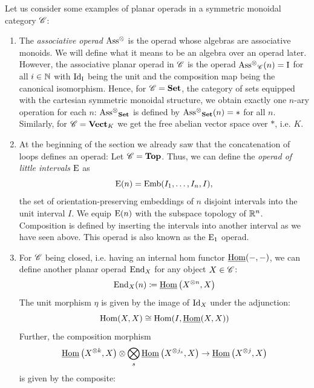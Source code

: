     \begin{egs}\label{egs_planar_operad} Let us consider some examples of planar
        operads in a symmetric monoidal category $\mathscr{C}$:
        \begin{enumerate} 
            \item The \textit{associative operad} $\operatorname{Ass^{\otimes}}$ is the operad whose
            algebras are associative monoids. We will define what it means to be
            an algebra over an operad later. However, the associative planar
            operad in $\mathscr{C}$ is the operad $\operatorname{Ass^{\otimes}}_{\mathscr{C}}(n) = \operatorname{I}$ for all $i \in \mathbb{N}$
            with $\operatorname{Id}_{\operatorname{I}}$ being the unit and the composition map being the
            canonical isomorphism. Hence, for $\mathscr{C}=\operatorname{\textbf{Set}}$, the category of sets
            equipped with the cartesian symmetric monoidal structure, we obtain
            exactly one $n$-ary operation for each $n$: $\operatorname{Ass^{\otimes}}_{\operatorname{\textbf{Set}}}$ is defined
            by $\operatorname{Ass^{\otimes}}_{\operatorname{\textbf{Set}}}(n) = \ast$ for all $n$. Similarly, for $\mathscr{C} =
            \operatorname{\textbf{Vect}}_K$ we get the free abelian vector space over $\ast$, i.e. $K$.
            
        
            \item At the beginning of the section we already saw that the
            concatenation of loops defines an operad: Let $\mathscr{C} = \operatorname{\textbf{Top}}$. Thus, we
            can define the \textit{operad of little intervals} $\operatorname{E}$ as
            \[
                \operatorname{E}(n) = \operatorname{Emb}(I_1, \dots, I_n, I),
            \]
            the set of orientation-preserving embeddings of $n$ disjoint
            intervals into the unit interval $I$. We equip $\operatorname{E}(n)$ with the
            subspace topology of $\mathbb{R}^n$. Composition is defined by inserting the
            intervals into another interval as we have seen above. This operad
            is also known as the $\operatorname{E}_1$ operad.
            
            \item For $\mathscr{C}$ being closed, i.e. having an internal hom functor
            $\operatorname{\underline{Hom}}(-, -)$, we can define another planar operad $\operatorname{End}_X$ for any
            object $X \in \mathscr{C}$:
            \[
                \operatorname{End}_X(n) \coloneqq \operatorname{\underline{Hom}}\left(X^{\otimes n}, X\right)
            \]
            The unit morphism $\eta$ is given by the image of $\operatorname{Id}_X$ under the
            adjunction:
            \[
                \operatorname{Hom}(X,X) \cong \operatorname{Hom}(I, \operatorname{\underline{Hom}}(X,X))
            \]
            Further, the composition morphism 
            \[
                \operatorname{\underline{Hom}}\left(X^{\otimes k}, X\right) \otimes \bigotimes_s \operatorname{\underline{Hom}}\left(X^{\otimes j_s}, X\right) \to \operatorname{\underline{Hom}}\left(X^{\otimes j}, X\right)
            \]
            is given by the composite:
            

\end{enumerate}
\end{egs}
